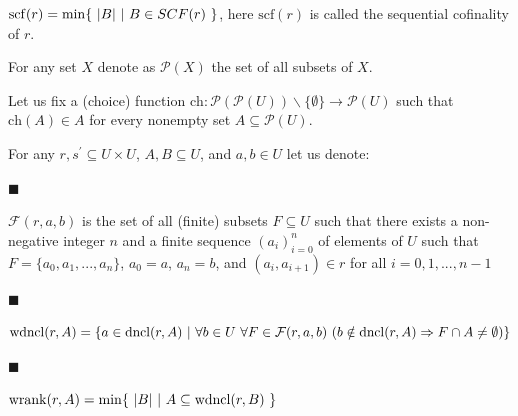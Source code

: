 \documentclass[10pt,a4paper]{amsart}
\begin{document}
$\mathrm{scf}(r)=\min\{\leavevmode\nobreak\ |B|\leavevmode\nobreak\ |%
\leavevmode\nobreak\ B\in SCF(r)\leavevmode\nobreak\ \}$, here $\mathrm{scf}(r)$ is called the sequential cofinality of $r$.\par
 
 
  
 
 
For any set $X$ denote as $\mathcal{P}(X)$ the set of all subsets of $X$.\par
 
 
 
Let us fix a (choice) function $\mathrm{ch}:\mathcal{P}(\mathcal{P}(U))\backslash\{\emptyset\}\to\mathcal{P}(U)$ such that $\mathrm{ch}(A)\in A$ for every nonempty set $A\subseteq\mathcal{P}(U)$.\par
 
 
 
For any $r,s^{\prime}\subseteq U\times U$, $A,B\subseteq U$, and $a,b\in U$ let us denote:\par
  
\par\noindent  $\blacksquare$ 
 
$\mathcal{F}(r,a,b)$ is the set of all (finite) subsets $F\subseteq U$ such that there exists a non-negative integer $n$ and a finite sequence $(a_{i})_{i=0}^{n}$ of elements of $U$ such that $F=\{a_{0},a_{1},...,a_{n}\}$, $a_{0}=a$, $a_{n}=b$, and $(a_{i},a_{i+1})\in r$ for all $i=0,1,...,n-1$\par
 
 
 
\par\noindent  $\blacksquare$ 
 
$\mathrm{wdncl}(r,A)=\{a\in\mathrm{dncl}(r,A)\leavevmode\nobreak\ |\leavevmode%
\nobreak\ \forall b\in U\leavevmode\nobreak\ \forall F\in\mathcal{F}(r,a,b)%
\leavevmode\nobreak\ (b\notin\mathrm{dncl}(r,A)\Rightarrow F\cap A\neq%
\emptyset)\}$\par
 
 
 
\par\noindent  $\blacksquare$ 
 
$\mathrm{wrank}(r,A)=\min\{\leavevmode\nobreak\ |B|\leavevmode\nobreak\ |%
\leavevmode\nobreak\ A\subseteq\mathrm{wdncl}(r,B)\leavevmode\nobreak\ \}$\par
 
\end{document}
